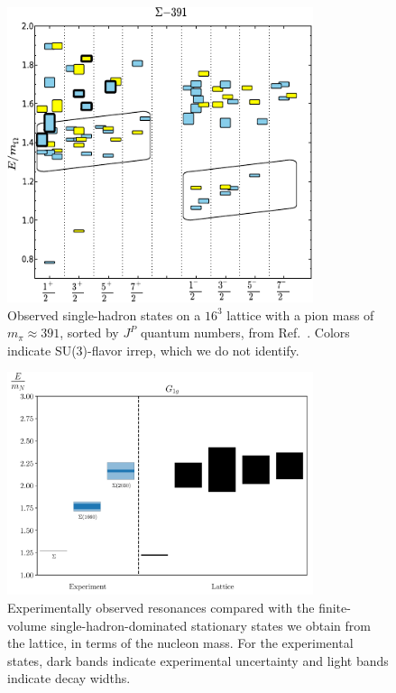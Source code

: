\begin{figure}[H]
    \centering
    \hspace*{-1cm}\includegraphics[width=0.8\textwidth]{figures/edwards.pdf}
    \caption[Observed single-hadron states on a $16^3$ lattice with a pion mass of $m_\pi \approx 391$, sorted by $J^P$ quantum numbers.]{Observed single-hadron states on a $16^3$ lattice with a pion mass of $m_\pi \approx 391$, sorted by $J^P$ quantum numbers, from Ref.~\cite{Edwards:2012fx}. Colors indicate SU(3)-flavor irrep, which we do not identify.}\label{fig:edwards}
\end{figure}

\begin{figure}[H]
    \centering
    \hspace*{-1cm}\includegraphics[width=0.8\textwidth]{figures/sigmas/g1g/expvslat.pdf}
    \caption[Experimentally observed resonances compared with the finite-volume single-hadron-dominated stationary states we obtain from the lattice in $G_{1g}$, in terms of the nucleon mass.]{Experimentally observed resonances compared with the finite-volume single-hadron-dominated stationary states we obtain from the lattice, in terms of the nucleon mass. For the experimental states, dark bands indicate experimental uncertainty and light bands indicate decay widths.}\label{fig:g1g_exp}
\end{figure}

